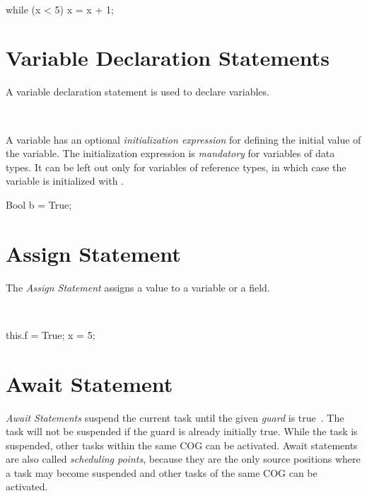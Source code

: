 \begin{abssyntax}
\ \TRS{(}  \TRS{)}\ 
\end{abssyntax}

\begin{absexample}
while (x < 5)
   x = x + 1;
\end{absexample}

\section{Variable Declaration Statements}
A variable declaration statement is used to declare variables.

\begin{abssyntax}
  {}\ \ \ \TRS{;}
\end{abssyntax}

A variable has an optional \emph{initialization expression} for defining the initial value of the variable. The initialization expression is \emph{mandatory} for variables of data types.
It can be left out only for variables of reference types, in which case the variable is initialized with .

\begin{absexample}
Bool b = True;
\end{absexample}

\section{Assign Statement}
The \emph{Assign Statement} assigns a value to a variable or a field.

\begin{abssyntax}
  {}\ \TRS{=}\ \ \TRS{;}
               {}\ \TRS{=}\ \ \TRS{;}
\end{abssyntax}

\begin{absexample}
this.f = True;
x = 5;
\end{absexample}


\section{Await Statement}
\emph{Await Statements} suspend the current task until the given
\emph{guard} is true~\cite{johnsen10fmco}. The task will not be
suspended if the guard is already initially true.  While the task is
suspended, other tasks within the same COG can be activated.  Await
statements are also called \emph{scheduling points}, because they are
the only source positions where a task may become suspended and other
tasks of the same COG can be activated.


